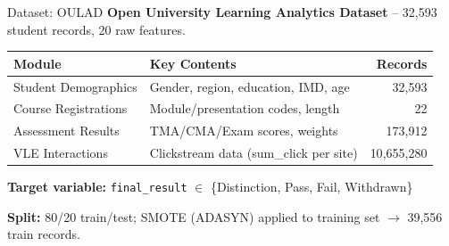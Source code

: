 \documentclass[aspectratio=169]{beamer}
\begin{document}
\begin{frame}{Dataset: OULAD}
\textbf{Open University Learning Analytics Dataset} -- 32{,}593 student records, 20 raw features.

\vspace{0.3cm}
\begin{table}[h]
\centering
\small
\begin{tabular}{@{}llr@{}}
\toprule
\textbf{Module} & \textbf{Key Contents} & \textbf{Records} \\
\midrule
Student Demographics & Gender, region, education, IMD, age & 32{,}593 \\
Course Registrations & Module/presentation codes, length & 22 \\
Assessment Results & TMA/CMA/Exam scores, weights & 173{,}912 \\
VLE Interactions & Clickstream data (sum\_click per site) & 10{,}655{,}280 \\
\bottomrule
\end{tabular}
\end{table}

\vspace{0.3cm}
\textbf{Target variable:} \texttt{final\_result} $\in$ \{Distinction, Pass, Fail, Withdrawn\}

\vspace{0.2cm}
\textbf{Split:} 80/20 train/test; SMOTE (ADASYN) applied to training set $\rightarrow$ 39{,}556 train records.
\end{frame}
\end{document}
